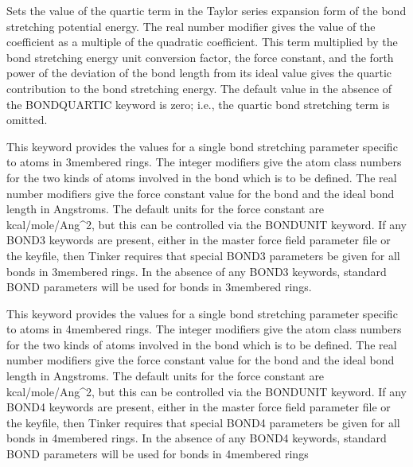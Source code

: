 \documentclass[letterpaper,11pt,english]{sphinxmanual}
\begin{document}
  Sets the value of the quartic term in the Taylor series expansion form of the bond stretching potential energy. The real number modifier gives the value of the coefficient as a multiple of the quadratic coefficient. This term multiplied by the bond stretching energy unit conversion factor, the force constant, and the forth power of the deviation of the bond length from its ideal value gives the quartic contribution to the bond stretching energy. The default value in the absence of the BOND\sphinxhyphen{}QUARTIC keyword is zero; i.e., the quartic bond stretching term is omitted.

  This keyword provides the values for a single bond stretching parameter specific to atoms in 3\sphinxhyphen{}membered rings. The integer modifiers give the atom class numbers for the two kinds of atoms involved in the bond which is to be defined. The real number modifiers give the force constant value for the bond and the ideal bond length in Angstroms. The default units for the force constant are kcal/mole/Ang\textasciicircum{}2, but this can be controlled via the BONDUNIT keyword. If any BOND3 keywords are present, either in the master force field parameter file or the keyfile, then Tinker requires that special BOND3 parameters be given for all bonds in 3\sphinxhyphen{}membered rings. In the absence of any BOND3 keywords, standard BOND parameters will be used for bonds in 3\sphinxhyphen{}membered rings.

  This keyword provides the values for a single bond stretching parameter specific to atoms in 4\sphinxhyphen{}membered rings. The integer modifiers give the atom class numbers for the two kinds of atoms involved in the bond which is to be defined. The real number modifiers give the force constant value for the bond and the ideal bond length in Angstroms. The default units for the force constant are kcal/mole/Ang\textasciicircum{}2, but this can be controlled via the BONDUNIT keyword. If any BOND4 keywords are present, either in the master force field parameter file or the keyfile, then Tinker requires that special BOND4 parameters be given for all bonds in 4\sphinxhyphen{}membered rings. In the absence of any BOND4 keywords, standard BOND parameters will be used for bonds in 4\sphinxhyphen{}membered rings
\end{document}
